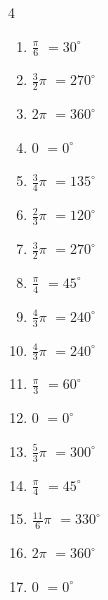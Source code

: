 \begin{multicols}{4}
\begin{enumerate}
  \item $\displaystyle \frac{\pi}{6}$
        $\displaystyle =30^{\circ}$

  \item $\displaystyle \frac{3}{2}\pi$
        $\displaystyle =270^{\circ}$

  \item $\displaystyle 2\pi$
        $\displaystyle =360^{\circ}$

  \item $\displaystyle 0$
        $\displaystyle =0^{\circ}$

  \item $\displaystyle \frac{3}{4}\pi$
        $\displaystyle =135^{\circ}$

\columnbreak %

  \item $\displaystyle \frac{2}{3}\pi$
        $\displaystyle =120^{\circ}$

  \item $\displaystyle \frac{3}{2}\pi$
        $\displaystyle =270^{\circ}$

  \item $\displaystyle \frac{\pi}{4}$
        $\displaystyle =45^{\circ}$

  \item $\displaystyle \frac{4}{3}\pi$
        $\displaystyle =240^{\circ}$

  \item $\displaystyle \frac{4}{3}\pi$
        $\displaystyle =240^{\circ}$

  \item $\displaystyle \frac{\pi}{3}$
        $\displaystyle =60^{\circ}$

  \item $\displaystyle 0$
        $\displaystyle =0^{\circ}$

  \item $\displaystyle \frac{5}{3}\pi$
        $\displaystyle =300^{\circ}$

  \item $\displaystyle \frac{\pi}{4}$
        $\displaystyle =45^{\circ}$

  \item $\displaystyle \frac{11}{6}\pi$
        $\displaystyle =330^{\circ}$

  \item $\displaystyle 2\pi$
        $\displaystyle =360^{\circ}$

  \item $\displaystyle 0$
        $\displaystyle =0^{\circ}$


\end{enumerate}
\end{multicols}
